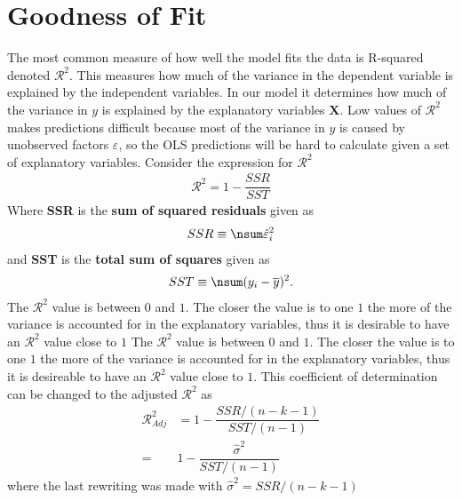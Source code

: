 \section{Goodness of Fit}

The most common measure of how well the model fits the data is R-squared denoted $\mathcal{R}^2$.
This measures how much of the variance in the dependent variable is explained by the independent variables. 
In our model it determines how much of the variance in $y$ is explained by the explanatory variables $\mathbf{X}$. 
Low values of $\mathcal{R}^2$ makes predictions difficult because most of the variance in $y$ is caused by unobserved factors $\varepsilon$, so the OLS predictions will be hard to calculate given a set of explanatory variables.
Consider the expression for $\mathcal{R}^2$
\begin{align*}
    \mathcal{R}^2 = 1 - \dfrac{SSR}{SST}
\end{align*}
Where \textbf{SSR} is the \textbf{sum of squared residuals} given as
\begin{align*}
    SSR \equiv \nsum \hat{\varepsilon}_i^2
\end{align*}
and \textbf{SST} is the \textbf{total sum of squares} given as
\begin{align*}
    SST \equiv \nsum (y_i - \overline{y})^2. 
\end{align*}
The $\mathcal{R}^2$ value is between $0$ and $1$.
The closer the value is to one $1$ the more of the variance is accounted for in the explanatory variables, thus it is desirable to have an $\mathcal{R}^2$ value close to $1$ The $\mathcal{R}^2$ value is between $0$ and $1$. 
The closer the value is to one $1$ the more of the variance is accounted for in the explanatory variables, thus it is desireable to have an $\mathcal{R}^2$ value close to $1$.
This coefficient of determination can be changed to the adjusted $\mathcal{R}^2$ as
\begin{align*}
    \mathcal{R}^2_{Adj} &= 1 - \dfrac{SSR/(n - k - 1)}{SST/(n - 1)}\\
    =& 1 - \dfrac{\hat{\sigma}^2}{SST/(n-1)}
\end{align*}
where the last rewriting was made with $\hat{\sigma}^2 = SSR/(n-k-1)$
 
 
 










